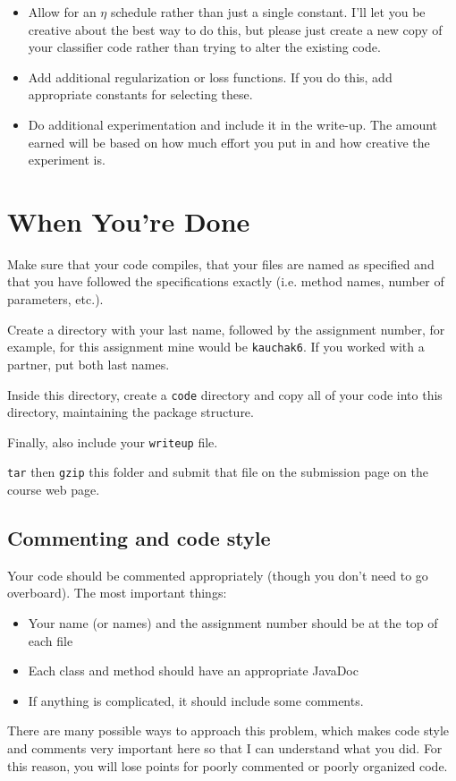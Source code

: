 \documentclass[11pt]{article}
\begin{document}
\begin{itemize}

\item Allow for an $\eta$ schedule rather than just a single constant.  I'll let you be creative about the best way to do this, but please just create a new copy of your classifier code rather than trying to alter the existing code.

\item Add additional regularization or loss functions.  If you do this, add appropriate constants for selecting these.

\item Do additional experimentation and include it in the write-up.  The amount earned will be based on how much effort you put in and how creative the experiment is.

\end{itemize}

\section{When You're Done}

Make sure that your code compiles, that your files are named as specified and that you have followed the specifications exactly (i.e. method names, number of parameters, etc.).

Create a directory with your last name, followed by the assignment number, for example, for this assignment mine would be \texttt{kauchak6}.  If you worked with a partner, put both last names.

Inside this directory, create a \texttt{code} directory and copy all of your code into this directory, maintaining the package structure.

Finally, also include your \texttt{writeup} file.

\texttt{tar} then \texttt{gzip} this folder and submit that file on the submission page on the course web page.

\subsection*{Commenting and code style}

Your code should be commented appropriately (though you don't need to go overboard).    The most important things:

\begin{itemize}
\item Your name (or names) and the assignment number should be at the top of each file
\item Each class and method should have an appropriate JavaDoc
\item If anything is complicated, it should include some comments.
\end{itemize}

There are many possible ways to approach this problem, which makes code style and comments very important here so that I can understand what you did.  For this reason, you will lose points for poorly commented or poorly organized code.
\end{document}
